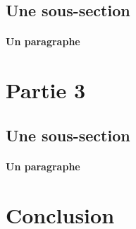 \documentclass[11pt, oneside]{article}
\begin{document}
\subsection{Une sous-section}
\paragraph{Un paragraphe}

\section{Partie 3}
\subsection{Une sous-section}
\paragraph{Un paragraphe}

\section{Conclusion}
\end{document}
